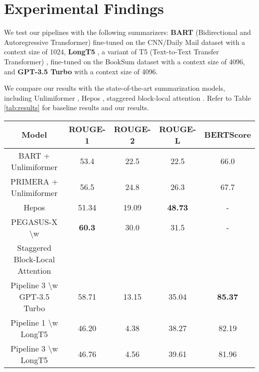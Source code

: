 \section{Experimental Findings}

We test our pipelines with the following summarizers: \textbf{BART} (Bidirectional
and Autoregressive Transformer) \cite{lewis-etal-2020-bart} fine-tuned on the
CNN/Daily Mail dataset \cite{nallapati2016abstractive} with a context size of 1024,
\textbf{LongT5} \cite{guo2021longt5}, a variant of T5 (Text-to-Text Transfer
Transformer) \cite{raffel2020exploring}, fine-tuned on the BookSum dataset with
a context size of 4096, and \textbf{GPT-3.5 Turbo} \cite{brown2020language} with a
context size of 4096.

We compare our results with the state-of-the-art summarization models, including
Unlimiformer \cite{bertsch2023unlimiformer}, Hepos \cite{huang-etal-2021-efficient},
staggered block-local attention \cite{phang2022investigating}.
Refer to Table \ref{tab:results} for baseline results and our results.

\begin{table*}[!ht]
	\centering

	\begin{tabular}{c c c c c}
		\hline
		\textbf{Model} & \textbf{ROUGE-1} & \textbf{ROUGE-2} & \textbf{ROUGE-L} &
		\textbf{BERTScore} \\
		\hline
		BART + Unlimiformer & 53.4 & 22.5 & 22.5 & 66.0 \\
		PRIMERA + Unlimiformer & 56.5 & 24.8 & 26.3 & 67.7 \\
		Hepos & 51.34 & 19.09 & \textbf{48.73} & - \\
		PEGASUS-X \textbackslash w & \textbf{60.3} & 30.0 & 31.5 & - \\
		Staggered Block-Local Attention & & & & \\
		\hline
		Pipeline 3 \textbackslash w GPT-3.5 Turbo & 58.71 & 13.15 & 35.04 & \textbf{85.37} \\
		Pipeline 1 \textbackslash w LongT5 & 46.20 & 4.38 & 38.27 & 82.19 \\
		Pipeline 3 \textbackslash w LongT5 & 46.76 & 4.56 & 39.61 & 81.96 \\
		\hline
	\end{tabular}

	\caption{Automatic evaluation results on GovReport dataset}
	\label{tab:results}
\end{table*}
